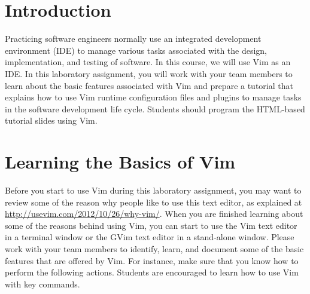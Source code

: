 

\usepackage[compact]{titlesec}



\section*{Introduction}

Practicing software engineers normally use an integrated development environment (IDE) to manage various tasks
associated with the design, implementation, and testing of software. In this course, we will use Vim as an IDE.  In this
laboratory assignment, you will work with your team members to learn about the basic features associated with Vim and
prepare a tutorial that explains how to use Vim runtime configuration files and plugins to manage tasks in the software
development life cycle.  Students should program the HTML-based tutorial slides using Vim.

\section*{Learning the Basics of Vim}

Before you start to use Vim during this laboratory assignment, you may want to review some of the reason why people like
to use this text editor, as explained at \url{http://usevim.com/2012/10/26/why-vim/}.  When you are finished learning
about some of the reasons behind using Vim, you can start to use the Vim text editor in a terminal window or the GVim
text editor in a stand-alone window.  Please work with your team members to identify, learn, and document some of the
basic features that are offered by Vim.  For instance, make sure that you know how to perform the following actions.
Students are encouraged to learn how to use Vim with key commands.

